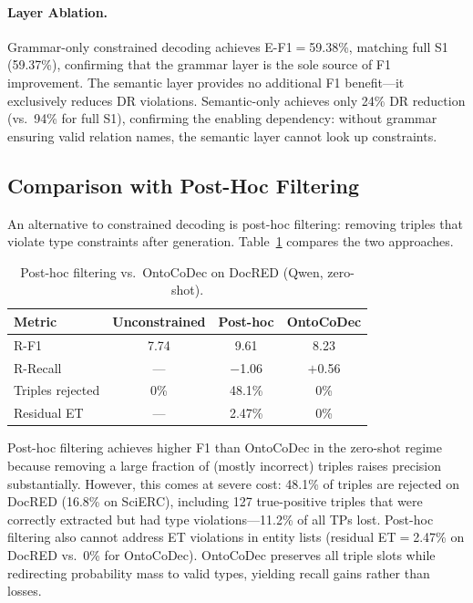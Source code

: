 \documentclass[11pt,a4paper]{article}
\newcommand{\sys}{OntoCoDec}
\newcommand{\pp}{\text{pp}}
\begin{document}
\paragraph{Layer Ablation.}
Grammar-only constrained decoding achieves E-F1$=$59.38\%, matching full S1 (59.37\%), confirming that the grammar layer is the sole source of F1 improvement.
The semantic layer provides no additional F1 benefit---it exclusively reduces DR violations.
Semantic-only achieves only 24\% DR reduction (vs.\ 94\% for full S1), confirming the enabling dependency: without grammar ensuring valid relation names, the semantic layer cannot look up constraints.

\subsection{Comparison with Post-Hoc Filtering}
\label{sec:posthoc}

An alternative to constrained decoding is post-hoc filtering: removing triples that violate type constraints after generation.
Table~\ref{tab:posthoc} compares the two approaches.

\begin{table}[t]
\centering
\small
\caption{Post-hoc filtering vs.\ \sys{} on DocRED (Qwen, zero-shot).}
\label{tab:posthoc}
\begin{tabular}{lccc}
\toprule
\textbf{Metric} & \textbf{Unconstrained} & \textbf{Post-hoc} & \textbf{\sys{}} \\
\midrule
R-F1 & 7.74 & 9.61 & 8.23 \\
R-Recall & --- & $-$1.06\pp{} & $+$0.56\pp{} \\
Triples rejected & 0\% & 48.1\% & 0\% \\
Residual ET & --- & 2.47\% & 0\% \\
\bottomrule
\end{tabular}
\end{table}

Post-hoc filtering achieves higher F1 than \sys{} in the zero-shot regime because removing a large fraction of (mostly incorrect) triples raises precision substantially.
However, this comes at severe cost: 48.1\% of triples are rejected on DocRED (16.8\% on SciERC), including 127 true-positive triples that were correctly extracted but had type violations---11.2\% of all TPs lost.
Post-hoc filtering also cannot address ET violations in entity lists (residual ET$=$2.47\% on DocRED vs.\ 0\% for \sys{}).
\sys{} preserves all triple slots while redirecting probability mass to valid types, yielding recall gains rather than losses.
\end{document}
